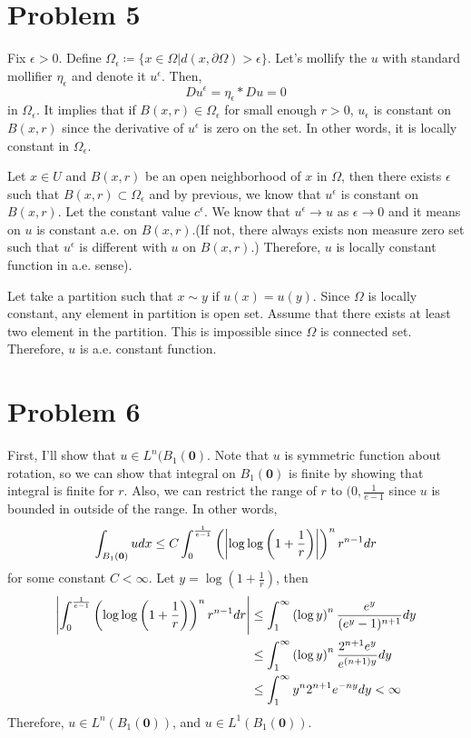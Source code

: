 \documentclass{article}
\begin{document}
\section*{Problem 5}
Fix $\epsilon>0$. Define $\Omega_\epsilon\coloneqq\{x\in \Omega|d(x,\partial \Omega)>\epsilon\}$. Let's mollify the $u$ with standard mollifier $\eta_\epsilon$ and denote it $u^\epsilon$. Then,
\begin{equation*}
Du^\epsilon=\eta_\epsilon*Du=0
\end{equation*}
in $\Omega_\epsilon$. It implies that if $B(x, r)\in \Omega_\epsilon$ for small enough $r>0$, $u_\epsilon$ is constant on $B(x,r)$ since the derivative of $u^\epsilon$ is zero on the set. In other words, it is locally constant in $\Omega_\epsilon$.

Let $x\in U$ and $B(x, r)$ be an open neighborhood of $x$ in $\Omega$, then there exists $\epsilon$ such that $B(x, r)\subset \Omega_\epsilon$ and by previous, we know that $u^\epsilon$ is constant on $B(x,r)$. Let the constant value $c^\epsilon$. We know that $u^\epsilon\rightarrow u$ as $\epsilon\rightarrow 0$ and it means on $u$ is constant a.e. on $B(x,r)$.(If not, there always exists non measure zero set such that $u^\epsilon$ is different with $u$ on $B(x,r)$.) Therefore, $u$ is locally constant function in a.e. sense).

Let take a partition such that $x\sim y$ if $u(x)=u(y)$. Since $\Omega$ is locally constant, any element in partition is open set. Assume that there exists at least two element in the partition. This is impossible since $\Omega$ is connected set. Therefore, $u$ is a.e. constant function.
\section*{Problem 6}
First, I'll show that $u\in L^n(B_1(\bm{0})$. Note that $u$ is symmetric function about rotation, so we can show that integral on $B_1(\bm{0})$ is finite by showing that integral is finite for $r$. Also, we can restrict the range of $r$ to $(0, \frac{1}{e-1}$ since $u$ is bounded in outside of the range. In other words,
\begin{equation*}
\int_{B_1(\bm{0})}udx\leq C\int_0^{\frac{1}{e-1}} \left(\abs{\log\log\left(1+\frac{1}{r}\right)}\right)^{n}r^{n-1}dr
\end{equation*}
for some constant $C<\infty$. Let $y=\log\left(1+\frac{1}{r}\right)$, then
\begin{equation*}
\begin{split}
\abs{\int_0^{\frac{1}{e-1}} \left(\log\log\left(1+\frac{1}{r}\right)\right)^{n}r^{n-1}dr}&\leq\int_{1}^\infty \left(\log y\right)^n \frac{e^y}{(e^y-1)^{n+1}} dy \\
&\leq \int_{1}^\infty\left(\log y\right)^n \frac{2^{n+1}e^y}{e^{(n+1)y}}dy \\
&\leq \int_{1}^\infty y^n 2^{n+1}e^{-ny}dy<\infty
\end{split}
\end{equation*}
Therefore, $u\in L^n(B_1(\bm{0}))$, and $u\in L^1(B_1(\bm{0}))$.
\end{document}
